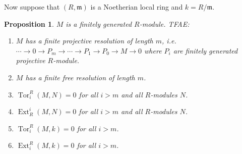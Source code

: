 \documentclass[cs4size]{article}
\newcommand{\frm}{\mathfrak{m}}
\newcommand{\ra}{\rightarrow}
\DeclareMathOperator{\Ext}{Ext}
\DeclareMathOperator{\Tor}{Tor}
\newtheorem{prop}{Proposition}
\begin{document}
Now suppose that $(R,\frm)$ is a Noetherian local ring and $k=R/\frm$. \begin{prop}
$M$ is a finitely generated $R$-module. TFAE:
\begin{enumerate}
\item $M$ has a finite projective resolution of length $m$, i.e. $\cdots \ra 0\ra P_m\ra\cdots\ra P_1\ra P_0\ra M\ra 0$ where $P_i$ are finitely generated projective $R$-module.
\item $M$ has a finite free resolution of length $m$.
\item $\Tor_i^R(M,N)=0$ for all $i>m$ and all $R$-modules $N$.
\item $\Ext_R^i(M,N)=0$ for all $i>m$ and all $R$-modules $N$.
\item $\Tor_i^R(M,k)=0$ for all $i>m$.
\item $\Ext_i^R(M,k)=0$ for all $i>m$.
\end{enumerate}
\end{prop}
\end{document}

